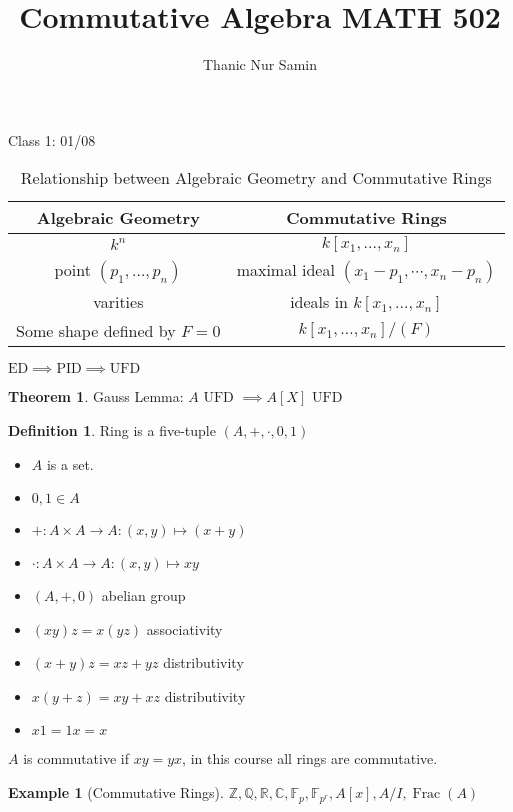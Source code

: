 \documentclass{article}
\title{Commutative Algebra MATH 502}
\author{Thanic Nur Samin}
\date{\vspace{-5ex}}
\theoremstyle{definition}
\newtheorem{example}{Example}
\newtheorem{definition}{Definition}
\newtheorem{theorem}{Theorem}
\newcommand{\Frac}{\operatorname{Frac}}
\begin{document}
\maketitle

Class 1: 01/08

\begin{table}[H]
    \centering
    \begin{tabular}{|c|c|}
        \toprule
            Algebraic Geometry &  Commutative Rings \\
        \midrule
            \(k^n\)  &  \(k[x_1, \dots, x_n ]\)  \\
            point \((p_1, \dots, p_n )\)  & maximal ideal \((x_1 - p_1,\cdots,x_n - p_n )\)  \\
            varities & ideals in \(k[x_1, \dots, x_n ]\)   \\
            Some shape defined by \(F=0\)  & \(k[x_1, \dots,x_n ]/(F)\)   \\
        \bottomrule
    \end{tabular}
    \caption{Relationship between Algebraic Geometry and Commutative Rings}
    \label{tab:algeocomring}
\end{table}

\(\text{ED} \implies \text{PID} \implies \text{UFD} \) 

\begin{theorem}
    Gauss Lemma: \(A \text{ UFD } \implies A[X] \text{ UFD} \) 
\end{theorem}

\begin{definition}
    Ring is a five-tuple \((A,+,\cdot,0,1)\) 
    \begin{itemize}
        
        \item \(A\) is a set.
        \item \(0,1\in A\) 
        \item \(+:A\times A \to A : (x,y) \mapsto (x+y)\)
        \item \(\cdot:A\times A\to A: (x,y)\mapsto xy\)
        \item \((A,+,0)\) abelian group
        \item \((xy)z=x(yz)\) associativity
        \item \((x+y)z=xz+yz\) distributivity
        \item \(x(y+z)=xy+xz\) distributivity
        \item \(x1=1x=x\)  
    \end{itemize}

    \(A\) is commutative if \(xy=yx\), in this course all rings are commutative.

    \begin{example}[Commutative Rings]
        \(\mathbb{Z},\mathbb{Q},\mathbb{R} ,\mathbb{C} ,\mathbb{F} _{p} ,\mathbb{F} _{p^r}, A[x],A/I,\Frac(A)\)         
    \end{example}

\end{definition}
\end{document}

